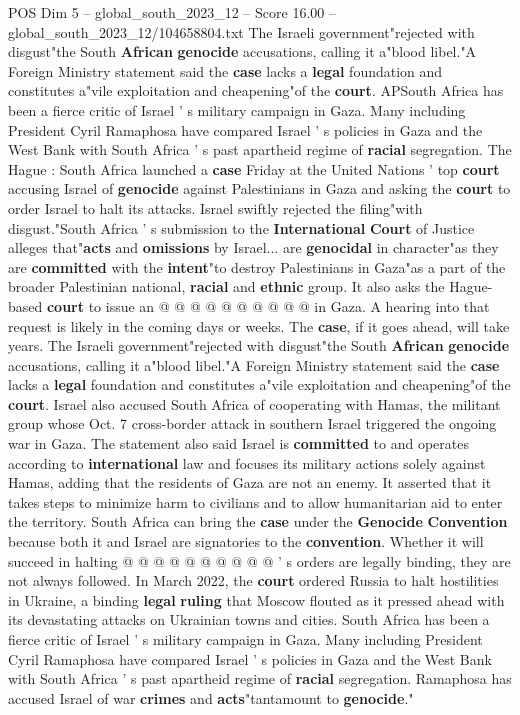\begin{textsample}{POS Dim 5 – global\_south\_2023\_12 – Score 16.00 – global\_south\_2023\_12/104658804.txt}  \label{ex:f5_pos_216}
The Israeli government"rejected with disgust"the South \textbf{African} \textbf{genocide} accusations, calling it a"blood libel."A Foreign Ministry statement said the \textbf{case} lacks a \textbf{legal} foundation and constitutes a"vile exploitation and cheapening"of the \textbf{court}.
APSouth Africa has been a fierce critic of Israel ' s military campaign in Gaza.
Many including President Cyril Ramaphosa have compared Israel ' s policies in Gaza and the West Bank with South Africa ' s past apartheid regime of \textbf{racial} segregation.
The Hague : South Africa launched a \textbf{case} Friday at the United Nations ' top \textbf{court} accusing Israel of \textbf{genocide} against Palestinians in Gaza and asking the \textbf{court} to order Israel to halt its attacks.
Israel swiftly rejected the filing"with disgust."South Africa ' s submission to the \textbf{International} \textbf{Court} of Justice alleges that"\textbf{acts} and \textbf{omissions} by Israel... are \textbf{genocidal} in character"as they are \textbf{committed} with the \textbf{intent}"to destroy Palestinians in Gaza"as a part of the broader Palestinian national, \textbf{racial} and \textbf{ethnic} group.
It also asks the Hague-based \textbf{court} to issue an @ @ @ @ @ @ @ @ @ @ in Gaza.
A hearing into that request is likely in the coming days or weeks.
The \textbf{case}, if it goes ahead, will take years.
The Israeli government"rejected with disgust"the South \textbf{African} \textbf{genocide} accusations, calling it a"blood libel."A Foreign Ministry statement said the \textbf{case} lacks a \textbf{legal} foundation and constitutes a"vile exploitation and cheapening"of the \textbf{court}.
Israel also accused South Africa of cooperating with Hamas, the militant group whose Oct. 7 cross-border attack in southern Israel triggered the ongoing war in Gaza.
The statement also said Israel is \textbf{committed} to and operates according to \textbf{international} law and focuses its military actions solely against Hamas, adding that the residents of Gaza are not an enemy.
It asserted that it takes steps to minimize harm to civilians and to allow humanitarian aid to enter the territory.
South Africa can bring the \textbf{case} under the \textbf{Genocide} \textbf{Convention} because both it and Israel are signatories to the \textbf{convention}.
Whether it will succeed in halting @ @ @ @ @ @ @ @ @ @ ' s orders are legally binding, they are not always followed.
In March 2022, the \textbf{court} ordered Russia to halt hostilities in Ukraine, a binding \textbf{legal} \textbf{ruling} that Moscow flouted as it pressed ahead with its devastating attacks on Ukrainian towns and cities.
South Africa has been a fierce critic of Israel ' s military campaign in Gaza.
Many including President Cyril Ramaphosa have compared Israel ' s policies in Gaza and the West Bank with South Africa ' s past apartheid regime of \textbf{racial} segregation.
Ramaphosa has accused Israel of war \textbf{crimes} and \textbf{acts}"tantamount to \textbf{genocide}."

\end{textsample}

